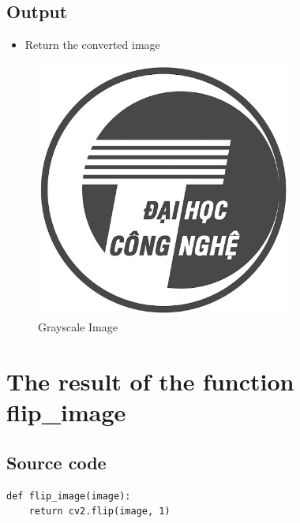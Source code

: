 \documentclass{article}
\begin{document}
\subsection{Output}
\begin{itemize}
    \item Return the converted image
\end{itemize}
\begin{figure}[H]
    \centering
    \includegraphics[width=0.75\textwidth]
    {lena_gray.jpg}
    \caption{Grayscale Image}
    \label{fig:grayscale_img}
\end{figure}

\section{The result of the function flip\_image}
\subsection{Source code}
\begin{lstlisting}[caption={Code of flip\_image() function}, label={flip\_image}]
def flip_image(image):
    return cv2.flip(image, 1)
\end{lstlisting}
\end{document}
